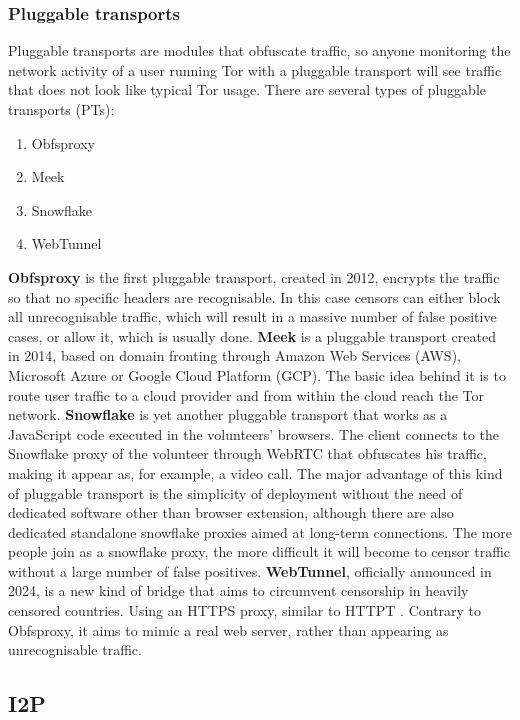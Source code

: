 \subsubsection{Pluggable transports}
Pluggable transports are modules that obfuscate traffic, so anyone monitoring the network activity of a user running Tor with a pluggable transport will see traffic that does not look like typical Tor usage. There are several types of pluggable transports (PTs):
\begin{enumerate}
    \item Obfsproxy
    \item Meek
    \item Snowflake
    \item WebTunnel
\end{enumerate}

\textbf{Obfsproxy} is the first pluggable transport, created in 2012, encrypts the traffic so that no specific headers are recognisable. In this case censors can either block all unrecognisable traffic, which will result in a massive number of false positive cases, or allow it, which is usually done. \textbf{Meek} is a pluggable transport created in 2014, based on domain fronting through Amazon Web Services (AWS), Microsoft Azure or Google Cloud Platform (GCP). The basic idea behind it is to route user traffic to a cloud provider and from within the cloud reach the Tor network. \textbf{Snowflake} is yet another pluggable transport that works as a JavaScript code executed in the volunteers' browsers. The client connects to the Snowflake proxy of the volunteer through WebRTC that obfuscates his traffic, making it appear as, for example, a video call. The major advantage of this kind of pluggable transport is the simplicity of deployment without the need of dedicated software other than browser extension, although there are also dedicated standalone snowflake proxies aimed at long-term connections. The more people join as a snowflake proxy, the more difficult it will become to censor traffic without a large number of false positives. \textbf{WebTunnel}, officially announced in 2024, is a new kind of bridge that aims to circumvent censorship in heavily censored countries. Using an HTTPS proxy, similar to HTTPT \cite{httpt}. Contrary to Obfsproxy, it aims to mimic a real web server, rather than appearing as unrecognisable traffic.

\subsection{I2P}

